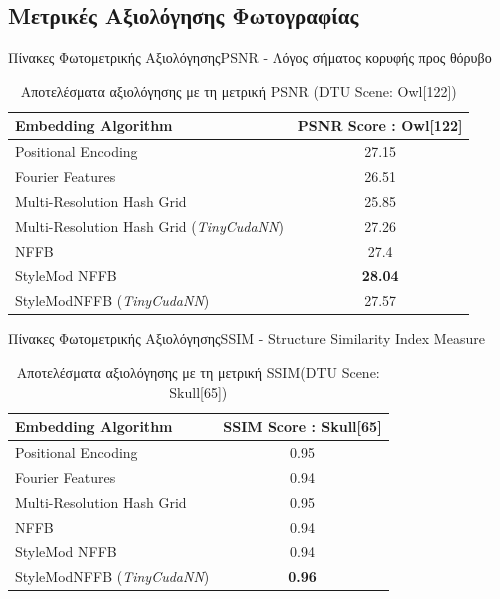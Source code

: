 \documentclass[10pt]{beamer}
\begin{document}
\subsection{Μετρικές Αξιολόγησης Φωτογραφίας}
\begin{frame}{Πίνακες Φωτομετρικής Αξιολόγησης}{PSNR - Λόγος σήματος κορυφής προς θόρυβο}
    \begin{table}[H]
    \centering
    \begin{tabular}{|l|c|}
    \hline
    \textbf{Embedding Algorithm} & \textbf{PSNR Score : Owl[122]} \\
    \hline
    Positional Encoding & 27.15 \\
    \hline
    Fourier Features & 26.51 \\
    \hline
    Multi-Resolution Hash Grid & 25.85 \\
    \hline
    Multi-Resolution Hash Grid (\textit{TinyCudaNN}) & 27.26 \\
    \hline
    NFFB & 27.4 \\
    \hline
    StyleMod NFFB & \textbf{28.04} \\
    \hline
    StyleModNFFB (\textit{TinyCudaNN}) & 27.57 \\
    \hline
    \end{tabular}
    \caption{Αποτελέσματα αξιολόγησης με τη μετρική PSNR (DTU Scene: Owl[122])}
    \end{table}
\end{frame}
\begin{frame}{Πίνακες Φωτομετρικής Αξιολόγησης}{SSIM - Structure Similarity Index Measure}
    \begin{table}[H]
    \centering
    \begin{tabular}{|l|c|}
    \hline
    \textbf{Embedding Algorithm} & \textbf{SSIM Score : Skull[65]} \\
    \hline
    Positional Encoding & 0.95 \\
    \hline
    Fourier Features & 0.94 \\
    \hline
    Multi-Resolution Hash Grid & 0.95 \\
    \hline
    NFFB & 0.94 \\
    \hline
    StyleMod NFFB & 0.94 \\
    \hline
    StyleModNFFB (\textit{TinyCudaNN}) & \textbf{0.96} \\
    \hline
    \end{tabular}
    \caption{Αποτελέσματα αξιολόγησης με τη μετρική SSIM(DTU Scene: Skull[65])}
    \end{table}
\end{frame}
\end{document}
